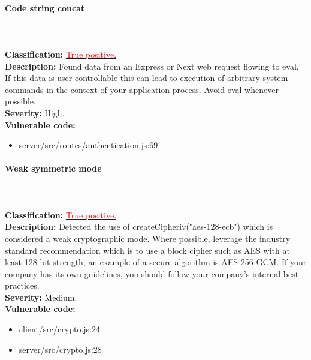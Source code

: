\documentclass[]{article}
\begin{document}
\paragraph{Code string concat} \mbox{} \\ \\
\textbf{Classification:} \hyperref[subsubsec:improper_neutralization_of_directives_in_dynamically_evaluated_code]{\textcolor{red}{True} \textcolor{red}{positive}.} \\ 
\textbf{Description:} Found data from an Express or Next web request flowing to eval. If this data is user-controllable this can 
lead to execution of arbitrary system commands in the context of your application process. Avoid eval whenever possible. \\ 
\textbf{Severity:} High. \\ 
\textbf{Vulnerable code:} 
\begin{itemize}
    \item server/src/routes/authentication.js:69
\end{itemize}

\paragraph{Weak symmetric mode} \mbox{} \\ \\
\textbf{Classification:} \hyperref[subsubsec:use_of_a_broken_or_risky_cryptographic_algorithm]{\textcolor{red}{True} \textcolor{red}{positive}.} \\ 
\textbf{Description:} Detected the use of createCipheriv("aes-128-ecb") which is considered a weak cryptographic mode. Where possible, 
leverage the industry standard recommendation which is to use a block cipher such as AES with at least 128-bit strength, an example 
of a secure algorithm is AES-256-GCM. If your company has its own guidelines, you should follow your company's internal best practices. \\ 
\textbf{Severity:} Medium. \\ 
\textbf{Vulnerable code:} 
\begin{itemize}
    \item client/src/crypto.js:24
    \item server/src/crypto.js:28
\end{itemize}
\end{document}
